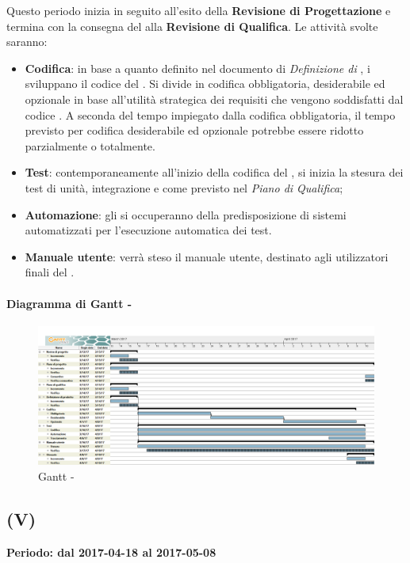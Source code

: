 \documentclass[./PianoDiProgetto.tex]{subfiles}
\begin{document}
  Questo periodo inizia in seguito all'esito della \textbf{Revisione di Progettazione} e termina con la consegna del  alla \textbf{Revisione di Qualifica}. Le attività svolte saranno:
  \begin{itemize}
    \item \textbf{Codifica}: in base a quanto definito nel documento di \textit{Definizione di }, i \PRP{} sviluppano il codice del  . Si divide in codifica obbligatoria, desiderabile ed opzionale in base all'utilità strategica dei requisiti che vengono soddisfatti dal codice . A seconda del tempo impiegato dalla codifica obbligatoria, il tempo previsto per codifica desiderabile ed opzionale potrebbe essere ridotto parzialmente o totalmente.
    \item \textbf{Test}: contemporaneamente all'inizio della codifica del , si inizia la stesura dei test di unità, integrazione e  come previsto nel \textit{Piano di Qualifica};
    \item \textbf{Automazione}: gli \AMMP{} si occuperanno della predisposizione di sistemi automatizzati per l'esecuzione automatica dei test.
    \item \textbf{Manuale utente}: verrà steso il manuale utente, destinato agli utilizzatori finali del .
  \end{itemize}

  \newpage
  \paragraph{Diagramma di Gantt - \PerC}
    \begin{figure}[!h]
    \centering
    \includegraphics[width=\textwidth]{images/C}
    \caption{Gantt - \PerC}
    \end{figure}

  \subsection{\PerV (V)}
  \textbf{Periodo: dal 2017-04-18 al 2017-05-08}
\end{document}
